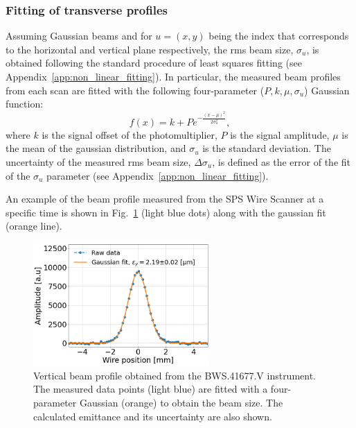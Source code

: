 \subsubsection*{Fitting of transverse profiles}
Assuming Gaussian beams and for $u=(x,y)$ being the index that corresponds to the horizontal and vertical plane respectively, the rms beam size, $\sigma_u$, is obtained following the standard procedure of least squares fitting (see Appendix~\ref{app:non_linear_fitting}). In particular, the measured beam profiles from each scan are fitted with the following four-parameter ($P, k, \mu, \sigma_u$) Gaussian function:
\begin{equation}\label{eq:4p_gauss}
   f(x) = k + P e^{-\frac{(x-\mu)^2}{2 \sigma_u^2}},
\end{equation}
where $k$ is the signal offset of the photomultiplier, $P$ is the signal amplitude, $\mu$ is the mean of the gaussian distribution, and $\sigma_u$ is the standard deviation. The uncertainty of the measured rms beam size, $\Delta \sigma_u$, is defined as the error of the fit of the $\sigma_u$ parameter (see Appendix~\ref{app:non_linear_fitting}).


An example of the beam profile measured from the SPS Wire Scanner at a specific time is shown in Fig.~\ref{fig:WS_example_V_profile} (light blue dots) along with the gaussian fit (orange line).
\begin{figure}[!h]
   \centering         
   \includegraphics[width=0.6\textwidth]{images/Ch5/SPS.BWS.41677.V_ROT_2018-09-05 15_45_01.33500_raw_and_fit.png}
       \caption{Vertical beam profile obtained from the BWS.41677.V instrument. The measured data points (light blue) are fitted with a four-parameter Gaussian (orange) to obtain the beam size. The calculated emittance and its uncertainty are also shown.}
       \label{fig:WS_example_V_profile}
\end{figure}
   
